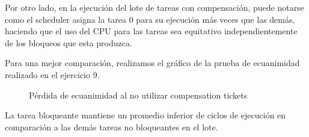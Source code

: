 \documentclass[a4paper,10pt,twoside]{article}
\begin{document}
Por otro lado, en la ejecución del lote de tareas con compensación, puede notarse como el scheduler asigna la tarea 0 para su ejecución más veces que las demás, haciendo que el uso del CPU para las tareas sea equitativo independientemente de los bloqueos que esta produzca.

Para una mejor comparación, realizamos el gráfico de la prueba de ecuanimidad realizado en el ejercicio 9.

\begin{figure}[H]
	\centering
	
	\caption{Pérdida de ecuanimidad al no utilizar compensation tickets}
\end{figure}

La tarea bloqueante mantiene un promedio inferior de ciclos de ejecución en comparación a las demás tareas no bloqueantes en el lote.
\end{document}
